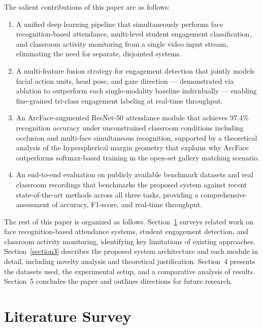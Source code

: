 \documentclass[preprint,12pt]{elsarticle}
\begin{document}
The salient contributions of this paper are as follows:
\begin{enumerate}
    \item A unified deep learning pipeline that simultaneously performs face recognition-based attendance, multi-level student engagement classification, and classroom activity monitoring from a single video input stream, eliminating the need for separate, disjointed systems.
    \item A multi-feature fusion strategy for engagement detection that jointly models facial action units, head pose, and gaze direction --- demonstrated via ablation to outperform each single-modality baseline individually --- enabling fine-grained tri-class engagement labeling at real-time throughput.
    \item An ArcFace-augmented ResNet-50 attendance module that achieves 97.4\% recognition accuracy under unconstrained classroom conditions including occlusion and multi-face simultaneous recognition, supported by a theoretical analysis of the hyperspherical margin geometry that explains why ArcFace outperforms softmax-based training in the open-set gallery matching scenario.
    \item An end-to-end evaluation on publicly available benchmark datasets and real classroom recordings that benchmarks the proposed system against recent state-of-the-art methods across all three tasks, providing a comprehensive assessment of accuracy, F1-score, and real-time throughput.
\end{enumerate}

The rest of this paper is organized as follows. Section~\ref{section2} surveys related work on face recognition-based attendance systems, student engagement detection, and classroom activity monitoring, identifying key limitations of existing approaches. Section~\ref{section3} describes the proposed system architecture and each module in detail, including novelty analysis and theoretical justification. Section~4 presents the datasets used, the experimental setup, and a comparative analysis of results. Section~5 concludes the paper and outlines directions for future research.

\section{Literature Survey} \label{section2}
\end{document}

